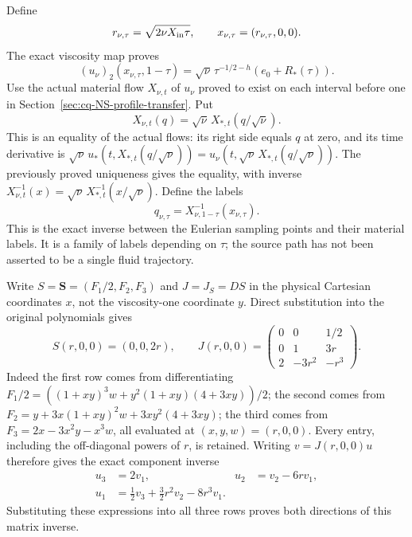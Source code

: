 Define
\[
 r_{\nu,\tau}=\sqrt{2\nu X_{\rm in}\tau},\qquad
 x_{\nu,\tau}=(r_{\nu,\tau},0,0).
\]
The exact viscosity map proves
\begin{equation}
 (u_\nu)_2(x_{\nu,\tau},1-\tau)
 =\sqrt\nu\,\tau^{-1/2-h}(e_0+R_*(\tau)).
 \label{eq:cq-nw:actualswirl}
\end{equation}
Use the actual material flow $X_{\nu,t}$ of $u_\nu$ proved to exist
on each interval before one in Section~\ref{sec:cq-NS-profile-transfer}. Put
\[
 X_{\nu,t}(q)=\sqrt\nu\,X_{*,t}(q/\sqrt\nu).
\]
This is an equality of the actual flows: its right side equals $q$ at
zero, and its time derivative is
$\sqrt\nu\,u_*(t,X_{*,t}(q/\sqrt\nu))
 =u_\nu(t,\sqrt\nu\,X_{*,t}(q/\sqrt\nu))$.
The previously proved uniqueness gives the equality, with inverse
$X_{\nu,t}^{-1}(x)=\sqrt\nu\,X_{*,t}^{-1}(x/\sqrt\nu)$.
Define the labels
\[
 q_{\nu,\tau}=X_{\nu,1-\tau}^{-1}(x_{\nu,\tau}).
\]
This is the exact inverse between the Eulerian sampling points and
their material labels. It is a family of labels depending on $\tau$;
the source path has not been asserted to be a single fluid trajectory.

Write $S=\mathbf S=(F_1/2,F_2,F_3)$ and $J=J_S=DS$ in the physical Cartesian
coordinates $x$, not the viscosity-one coordinate $y$. Direct
substitution into the original polynomials gives
\[
 S(r,0,0)=(0,0,2r),\qquad
 J(r,0,0)=\begin{pmatrix}
 0&0&1/2\\0&1&3r\\2&-3r^2&-r^3
 \end{pmatrix}.
\]
Indeed the first row comes from differentiating
$F_1/2=((1+xy)^3w+y^2(1+xy)(4+3xy))/2$;
the second comes from
$F_2=y+3x(1+xy)^2w+3xy^2(4+3xy)$; the third comes from
$F_3=2x-3x^2y-x^3w$, all evaluated at $(x,y,w)=(r,0,0)$.
Every entry, including the off-diagonal powers of $r$, is retained.
Writing $v=J(r,0,0)u$ therefore gives the exact component inverse
\begin{align*}
 u_3&=2v_1, &u_2&=v_2-6rv_1,\\
 u_1&=\tfrac12v_3+\tfrac32r^2v_2-8r^3v_1.
\end{align*}
Substituting these expressions into all three rows proves both
directions of this matrix inverse.


